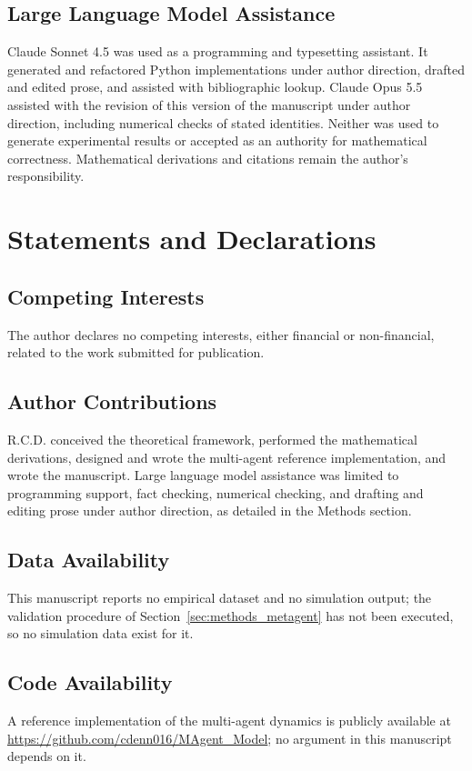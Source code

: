 \documentclass[11pt]{article}
\begin{document}
\subsection{Large Language Model Assistance}

Claude Sonnet 4.5 was used as a programming and typesetting assistant. It generated and refactored Python implementations under author direction, drafted and edited prose, and assisted with bibliographic lookup. Claude Opus 5.5 assisted with the revision of this version of the manuscript under author direction, including numerical checks of stated identities. Neither was used to generate experimental results or accepted as an authority for mathematical correctness. Mathematical derivations and citations remain the author's responsibility.

\section{Statements and Declarations}\label{sec:statements}

\subsection*{Competing Interests}
The author declares no competing interests, either financial or non-financial, related to the work submitted for publication.

\subsection*{Author Contributions}
R.C.D. conceived the theoretical framework, performed the mathematical derivations, designed and wrote the multi-agent reference implementation, and wrote the manuscript. Large language model assistance was limited to programming support, fact checking, numerical checking, and drafting and editing prose under author direction, as detailed in the Methods section.

\subsection*{Data Availability}
This manuscript reports no empirical dataset and no simulation output; the validation procedure of Section~\ref{sec:methods_metagent} has not been executed, so no simulation data exist for it.

\subsection*{Code Availability}
A reference implementation of the multi-agent dynamics is publicly available at \url{https://github.com/cdenn016/MAgent_Model}; no argument in this manuscript depends on it.
\end{document}
